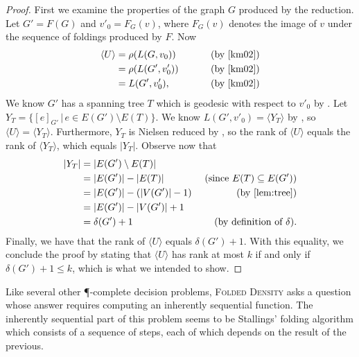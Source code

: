 \documentclass{article}
\newcommand{\FD}{\textsc{Folded Density}}
\newcommand{\gen}[1]{\langle #1 \rangle}
\begin{document}
\begin{proof}
  First we examine the properties of the graph $G$ produced by the reduction.
  Let $G' = F(G)$ and $v'_0 = F_G(v)$, where $F_G(v)$ denotes the image of $v$ under the sequence of foldings produced by $F$.
  Now
  \begin{align*}
    \gen{U} & = \rho(L(G, v_0)) & \qquad \text{ (by \cite[Proposition~3.8]{km02})} \\
            & = \rho(L(G', v'_0)) & \qquad \text{ (by \cite[Lemma~3.4]{km02})} \\
            & = L(G', v'_0), & \qquad \text{ (by \cite[Lemma~2.9]{km02})}
  \end{align*}
  We know $G'$ has a spanning tree $T$ which is geodesic with respect to $v'_0$ by \cite[Lemma~6.6]{km02}.
  Let $Y_T = \{[e]_{G'} \, | \, e \in E(G') \setminus E(T) \}$.
  We know $L(G', v'_0) = \gen{Y_T}$ by \cite[Lemma~6.1]{km02}, so $\gen{U} = \gen{Y_T}$.
  Furthermore, $Y_T$ is Nielsen reduced by \cite[Proposition~6.7]{km02}, so the rank of $\gen{U}$ equals the rank of $\gen{Y_T}$, which equals $|Y_T|$.
  Observe now that
  \begin{align*}
    |Y_T| & = |E(G') \setminus E(T)| & \\
          & = |E(G')| - |E(T)| & \text{ (since } E(T) \subseteq E(G') \text{)} \\
          & = |E(G')| - (|V(G')| - 1) & \text{ (by \autoref{lem:tree})} \\
          & = |E(G')| - |V(G')| + 1 & \\
          & = \delta(G') + 1 & \text{ (by definition of } \delta \text{)}.
  \end{align*}
  Finally, we have that the rank of $\gen{U}$ equals $\delta(G') + 1$.
  With this equality, we conclude the proof by stating that $\gen{U}$ has rank at most $k$ if and only if $\delta(G') + 1 \leq k$, which is what we intended to show.
\end{proof}

Like several other \P-complete decision problems, \FD{} asks a question whose answer requires computing an inherently sequential function.
The inherently sequential part of this problem seems to be Stallings' folding algorithm which consists of a sequence of steps, each of which depends on the result of the previous.
\end{document}

